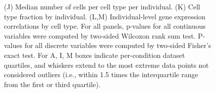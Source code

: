 \begin{figure}[ht]
{        (J) Median number of cells per cell type per individual. 
        (K) Cell type fraction by individual. (L,M) Individual-level gene expression correlations by cell type. For all panels, p-values for all continuous variables were computed by two-sided Wilcoxon rank sum test. P-values for all discrete variables were computed by two-sided Fisher’s exact test. For A, I, M boxes indicate per-condition dataset quartiles, and whiskers extend to the most extreme data points not considered outliers (i.e., within 1.5 times the interquartile range from the first or third quartile).
    }
    \label{fig:snRNA_quality_annotation}
\end{figure}